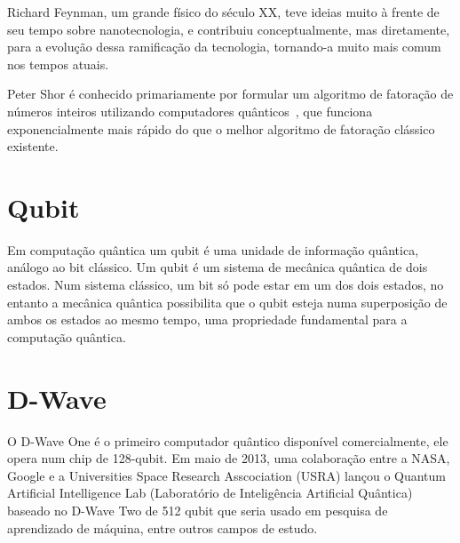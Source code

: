\documentclass[a4paper,twocolumn,10pt]{article}
\begin{document}
Richard Feynman, um grande físico do século XX, teve ideias muito à frente de
seu tempo sobre nanotecnologia, e contribuiu conceptualmente, mas diretamente,
para a evolução dessa ramificação da tecnologia, tornando-a muito mais comum
nos tempos atuais.

Peter Shor é conhecido primariamente por formular um algoritmo de fatoração de
números inteiros utilizando computadores quânticos~\cite{Shor}, que funciona
exponencialmente mais rápido do que o melhor algoritmo de fatoração clássico
existente.

\section{Qubit}

Em computação quântica um qubit é uma unidade de informação quântica, análogo
ao bit clássico. Um qubit é um sistema de mecânica quântica de dois estados.
Num sistema clássico, um bit só pode estar em um dos dois estados, no entanto a
mecânica quântica possibilita que o qubit esteja numa superposição de ambos os
estados ao mesmo tempo, uma propriedade fundamental para a computação quântica.

\section{D-Wave}

O D-Wave One é o primeiro computador quântico disponível comercialmente, ele
opera num chip de 128-qubit. Em maio de 2013, uma colaboração entre a NASA,
Google e a Universities Space Research Asscociation (USRA) lançou o Quantum
Artificial Intelligence Lab (Laboratório de Inteligência Artificial Quântica)
baseado no D-Wave Two de 512 qubit que seria usado em pesquisa de aprendizado
de máquina, entre outros campos de estudo.

\footnotesize  
\end{document}
